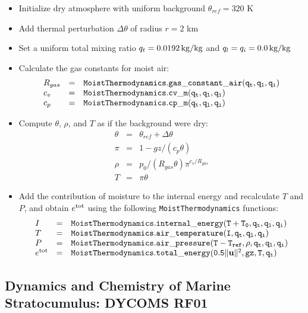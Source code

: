 \documentclass{article}
\begin{document}
{\begin{itemize}
\item Initialize dry atmosphere with uniform background $\theta_{ref} = 320$ K
\item Add thermal perturbation $\Delta \theta$ of radius $r=2$ km
\item Set a uniform total mixing ratio $q_t = 0.0192 \,{\rm kg/kg}$ and $q_l = q_i = 0.0\,{\rm kg/kg}$
\item Calculate the gas constants for moist air: 
\[\begin{array}{lcl}
R_{gas} &=& {\tt MoistThermodynamics.gas\_constant\_air(q_t, q_l, q_i)}\\
c_v     &=& {\tt MoistThermodynamics.cv\_m(q_t, q_l, q_i)}\\
c_p     &=& {\tt MoistThermodynamics.cp\_m(q_t, q_l, q_i)}\\
\end{array}
\]
\item  Compute $\theta$, $\rho$, and $T$ as if the background were dry:\\
    \[ \begin{array}{lcl}
  \theta &=& \theta_{ref} + \Delta\theta\\
 \pi & =& 1 - gz/(c_p\theta)\\
 \rho & = & p_0/(R_{gas}\theta)\pi^{c_v/R_{gas}}\\
 T   & = &\pi \theta
\end{array}\]

\item Add the contribution of moisture to the internal energy and recalculate $T$ and $P$, and obtain $e^{\rm tot}$ using the following {\tt MoistThermodynamics} functions:
\[\begin{array}{lcl}
I &=& {\tt MoistThermodynamics.internal\_energy(T + T_0, q_t, q_l, q_i)}\\
T &=& {\tt MoistThermodynamics.air\_temperature(I, q_t, q_l, q_i)}\\
P &=& {\tt MoistThermodynamics.air\_pressure(T - T_{ref} , \rho, q_t, q_l, q_i)}\\
e^{\rm tot} &=& {\tt MoistThermodynamics.total\_energy(0.5\|{\bf u} \|^2, gz, T, q_t)}
\end{array}\]
\end{itemize}

\subsection{Dynamics and Chemistry of Marine Stratocumulus: DYCOMS RF01}

}
\end{document}
